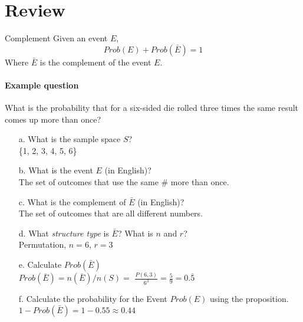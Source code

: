 \documentclass[a4paper,12pt]{book}
\title{}
\author{Rachel Morris}
\date{\today}
\newcounter{question}
\begin{document}
    \togglefalse{answerkey}

    \section{Review}

        \begin{intro}{Complement}
            Given an event $E$,
            $$ Prob(E) + Prob(\bar{E}) = 1 $$
            Where $\bar{E}$ is the complement of the event $E$.

            \paragraph{Example question}
            What is the probability that for a six-sided die rolled
            three times the same result comes up more than once?

            \begin{enumerate}
                \item[a.] What is the sample space $S$? \\
                    \{1, 2, 3, 4, 5, 6\}

                \item[b.] What is the event $E$ (in English)? \\
                    The set of outcomes that use the same \# more than once.

                \item[c.] What is the complement of $\bar{E}$ (in English)? \\
                    The set of outcomes that are all different numbers.

                \item[d.] What \textit{structure type} is $\bar{E}$? What is $n$ and $r$? \\
                    Permutation, $n = 6$, $r = 3$

                \item[e.] Calculate $Prob(\bar{E})$ \\
                    $Prob(\bar{E}) = n(\bar{E}) / n(S) =$
                    $\frac{P(6,3)}{6^{3}} = \frac{5}{9} = 0.\bar{5}$

                \item[f.] Calculate the probability for the Event $Prob(E)$ using the proposition. \\
                    $1 - Prob(\bar{E}) = 1 - 0.55 \approx 0.44$
            \end{enumerate}

        \end{intro}
\end{document}
